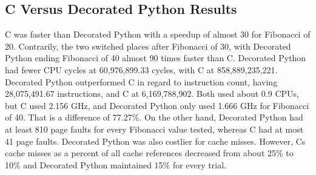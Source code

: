 \documentclass{sig-alternate}
\begin{document}
\subsection{C Versus Decorated Python Results}
C was faster than Decorated Python with a speedup of almost 30 for Fibonacci of 20. Contrarily, the two switched places after Fibonacci of 30, with Decorated Python ending Fibonacci of 40 almost 90 times faster than C. Decorated Python had fewer CPU cycles at 60,976,899.33 cycles, with C at 858,889,235,221. Decorated Python outperformed C in regard to instruction count, having 28,075,491.67 instructions, and C at 6,169,788,902. Both used about 0.9 CPUs, but C used 2.156 GHz, and Decorated Python only used 1.666 GHz for Fibonacci of 40. That is a difference of 77.27\%. On the other hand, Decorated Python had at least 810 page faults for every Fibonacci value tested, whereas C had at most 41 page faults. Decorated Python was also costlier for cache misses. However, Cs cache misses as a percent of all cache references decreased from about 25\% to 10\% and Decorated Python maintained 15\% for every trial.
\end{document}
